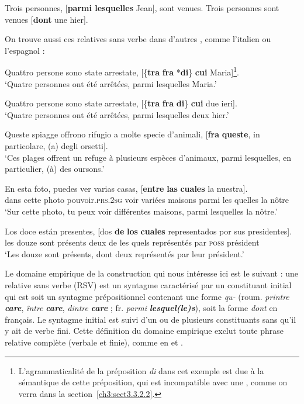 \ea \label{ch3:ex2}
\ea
Trois personnes, [\textbf{parmi lesquelles} Jean], sont venues.
\ex
Trois personnes sont venues [\textbf{dont} une hier].
\z
\z

On trouve aussi ces relatives sans verbe dans d’autres , comme l’italien  ou l’espagnol :


\ea\label{ch3:ex3}
 
\ea
Quattro persone sono state arrestate, [\{\textbf{tra} {\textbar} \textbf{fra} {\textbar} *\textbf{di}\} \textbf{cui} Maria]\footnote{L’agrammaticalité de la préposition \textit{di} dans cet exemple est due à la sémantique de cette préposition, qui est incompatible avec une , comme on verra dans la section~\ref{ch3:sect3.3.2.2}.}. \\
\glt ‘Quatre personnes ont été arrêtées, parmi lesquelles Maria.’

\ex
Quattro persone sono state arrestate, [\{\textbf{tra} {\textbar} \textbf{fra} {\textbar} \textbf{di}\} \textbf{cui} due ieri].\\
\glt ‘Quatre personnes ont été arrêtées, parmi lesquelles deux hier.’

\ex
Queste spiagge offrono rifugio a molte specie d’animali, [\textbf{fra} \textbf{queste}, in particolare, (a) degli orsetti].\\
\glt ‘Ces plages offrent un refuge à plusieurs espèces d’animaux, parmi lesquelles, en particulier, (à) des oursons.’
\z
\z


\ea \label{ch3:ex4}
\ea
\gll En  esta  foto,  puedes  ver  varias  casas,  [\textbf{entre} \textbf{las} \textbf{cuales} la  nuestra].\\
dans  cette  photo  pouvoir.\textsc{prs.2sg}  voir  variées  maisons  parmi  les  quelles la  nôtre\\ 
\glt ‘Sur cette photo, tu peux voir différentes maisons, parmi lesquelles la nôtre.’

\ex
\gll Los  doce  están  presentes,  [dos  \textbf{de} \textbf{los} \textbf{cuales}  representados  por  sus presidentes].\\
les  douze  sont  présents  deux  de  les  quels  représentés  par  \textsc{poss} président\\
\glt ‘Les douze sont présents, dont deux représentés par leur président.’ 
\z
\z

Le domaine empirique de la construction qui nous intéresse ici est le suivant : une relative sans verbe (RSV) est un syntagme caractérisé par un constituant initial qui est soit un syntagme prépositionnel contenant une forme \textit{qu-} (roum. \textit{printre} \textbf{\textit{care}}, \textit{între} \textbf{\textit{care}}, \textit{dintre} \textbf{\textit{care}} ; fr. \textit{parmi} \textbf{\textit{lesquel(le)s}}), soit la forme \textit{dont} en français. Le syntagme initial est suivi d’un ou de plusieurs constituants sans qu’il y ait de verbe fini. Cette définition du domaine empirique exclut toute phrase relative complète (verbale et finie), comme en  et .

